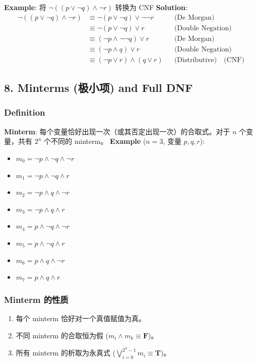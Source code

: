 \documentclass[10pt,a4paper,openany]{ctexbook}
\theoremstyle{definition}
\theoremstyle{remark}
\begin{document}
\textbf{Example}: 将 $\neg((p \lor \neg q) \land \neg r)$ 转换为 CNF
\textbf{Solution}:
\[
\begin{aligned}
\neg((p \lor \neg q) \land \neg r) &\equiv \neg(p \lor \neg q) \lor \neg\neg r &&\text{(De Morgan)} \\
&\equiv \neg(p \lor \neg q) \lor r &&\text{(Double Negation)} \\
&\equiv (\neg p \land \neg\neg q) \lor r &&\text{(De Morgan)} \\
&\equiv (\neg p \land q) \lor r &&\text{(Double Negation)} \\
&\equiv (\neg p \lor r) \land (q \lor r) &&\text{(Distributive)} \quad \text{(CNF)}
\end{aligned}
\]

\vspace{-2pt}

\subsection{8. Minterms (极小项) and Full DNF}

\subsubsection{Definition}

\textbf{Minterm}: 每个变量恰好出现一次（或其否定出现一次）的合取式。对于 $n$ 个变量，共有 $2^n$ 个不同的 minterm。
\textbf{Example} ($n=3$, 变量 $p,q,r$):
\begin{itemize}
\item $m_0 = \neg p \land \neg q \land \neg r$
\item $m_1 = \neg p \land \neg q \land r$
\item $m_2 = \neg p \land q \land \neg r$
\item $m_3 = \neg p \land q \land r$
\item $m_4 = p \land \neg q \land \neg r$
\item $m_5 = p \land \neg q \land r$
\item $m_6 = p \land q \land \neg r$
\item $m_7 = p \land q \land r$

\end{itemize}

\subsubsection{Minterm 的性质}

\begin{enumerate}
\item 每个 minterm 恰好对一个真值赋值为真。
\item 不同 minterm 的合取恒为假 ($m_i \land m_k \equiv \mathbf{F}$)。
\item 所有 minterm 的析取为永真式 ($\bigvee_{i=0}^{2^n-1} m_i \equiv \mathbf{T}$)。

\end{enumerate}
\end{document}
